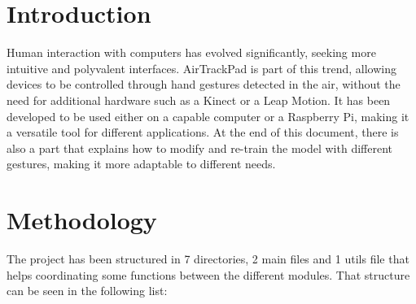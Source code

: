 \documentclass[a4paper,12pt]{article}
\newcommand{\vacio}{\textcolor{white}{ .}}
\begin{document}
{%

\renewcommand{\headrulewidth}{0.5pt}


\pagestyle{fancy}
\renewcommand{\footrulewidth}{0.5pt}
\fancyfoot[C]{\vacio}


\newpage

\renewcommand{\contentsname}{Index of contents}
\tableofcontents
{}

\newpage

\section{Introduction}

\vspace{0.5cm}

Human interaction with computers has evolved significantly, seeking more intuitive and polyvalent interfaces.
AirTrackPad is part of this trend, allowing devices to be controlled through hand gestures detected in the air, without the need for additional hardware such
as a Kinect or a Leap Motion. It has been developed to be used either on a capable computer or a Raspberry Pi, making it a versatile tool for different applications.
At the end of this document, there is also a part that explains how to modify and re-train the model with different gestures, making it more adaptable to different needs.

\vspace{0.5cm}

\section{Methodology}

The project has been structured in 7 directories, 2 main files and 1 utils file that helps coordinating some functions between the different modules. That structure
can be seen in the following list:

}
\end{document}
